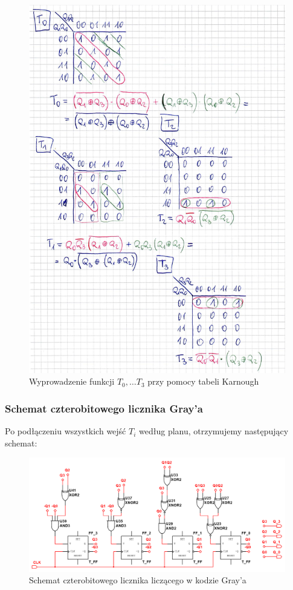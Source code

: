 \documentclass[12pt,a4paper,table]{article}
\begin{document}
    \begin{figure}[hp]
        \centering
        \includegraphics[width=\linewidth]{images/gray_wyprowadzenie.PNG}
        \caption{Wyprowadzenie funkcji $T_0, \dots T_3$ przy pomocy tabeli Karnough}
    \end{figure}


    \pagebreak
    \subsubsection{Schemat czterobitowego licznika Gray'a}
    Po podłączeniu wszystkich wejść $T_i$ według planu, otrzymujemy następujący schemat:
    \begin{figure}[h]
        \centering
        \includegraphics[width=0.85\linewidth]{images/gray_schematic.PNG}
        \caption{Schemat czterobitowego licznika liczącego w kodzie Gray'a}
        \label{fig:gray_schemat}
    \end{figure}
\end{document}
